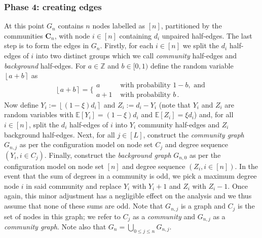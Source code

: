 \documentclass[12pt]{article}
\theoremstyle{definition}
\theoremstyle{remark}
\theoremstyle{remark}
\numberwithin{theorem}{section}
\providecommand{\Z}{}
\renewcommand{\Z}{\mathbb{Z}}
\newcommand{\E}[1]{{\mathbb E}\left[#1\right]}
\newcommand{\round}[1]{\ensuremath{\left\lfloor #1 \right\rceil}}
\begin{document}
\subsubsection*{Phase 4: creating edges}
At this point $G_n$ contains $n$ nodes labelled as $[n]$, partitioned by the communities $\textbf{C}_n$, with node $i \in [n]$ containing $d_i$ unpaired half-edges. The last step is to form the edges in $G_n$. Firstly, for each $i \in [n]$ we split the $d_i$ half-edges of $i$ into two distinct groups which we call \textit{community} half-edges and \textit{background} half-edges. For $a \in \Z$ and $b \in [0,1)$ define the random variable $\round{a+b}$ as
\[
\round{a+b} = \bigg\{
\begin{array}{ll}
a & \text{ with probability } 1-b, \text{ and}\\
a+1 & \text{ with probability } b \,.
\end{array}
\]
Now define $Y_i := \round{(1-\xi) d_i}$ and $Z_i := d_i - Y_i$ (note that $Y_i$ and $Z_i$ are random variables with $\E{Y_i} = (1-\xi) d_i$ and $\E{Z_i} = \xi d_i$) and, for all $i \in [n]$, split the $d_i$ half-edges of $i$ into $Y_i$ community half-edges and $Z_i$ background half-edges. Next, for all $j \in [L]$, construct the \textit{community graph} $G_{n,j}$ as per the configuration model on node set $C_j$ and degree sequence $(Y_i, i \in C_j)$. Finally, construct the \textit{background graph} $G_{n,0}$ as per the configuration model on node set $[n]$ and degree sequence $(Z_i,i \in [n])$. In the event that the sum of degrees in a community is odd, we pick a maximum degree node $i$ in said community and replace $Y_i$ with $Y_i + 1$ and $Z_i$ with $Z_i - 1$. Once again, this minor adjustment has a negligible effect on the analysis and we thus assume that none of these sums are odd. Note that $G_{n,j}$ is a graph and $C_j$ is the set of nodes in this graph; we refer to $C_j$ as a \textit{community} and $G_{n,j}$ as a \textit{community graph}. Note also that $G_n = \bigcup_{0 \leq j \leq n} G_{n,j}$.
\end{document}
